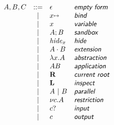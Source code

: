 \documentclass[12pt]{amsart}
\begin{document}
\thispagestyle{empty}
\pagestyle{empty}


\newcommand{\ef}{\ensuremath{\epsilon}}
\renewcommand{\root}[0]{\mbox{\textbf{R}}}
\newcommand{\bind}[0]{{{\raisebox{.2ex}{\scriptsize$\mapsto$}}}}
\newcommand{\hide}[1]{\mathit{hide}_{#1}}
\newcommand{\inspect}[0]{\mbox{\textbf{L}}}
\newcommand{\prl}[0]{~|~}
\newcommand{\rulename}[1]{\textsf{\textit{#1}}}

\[
\begin{array}{rcll}
A,B,C
&::=& \ef       & \rulename{empty form}\\
&|& x\bind      & \rulename{bind}\\
&|& x           & \rulename{variable}\\ 
&|& A; B        & \rulename{sandbox}\\
&|& \hide x     & \rulename{hide}\\
&|& A \cdot B   & \rulename{extension}\\
&|& \lambda x.A & \rulename{abstraction}\\
&|& AB          & \rulename{application}\\
&|& \root       & \rulename{current root}\\
&|& \inspect    & \rulename{inspect}\\
&|& A\prl B     & \rulename{parallel}\\
&|& \nu c.A     & \rulename{restriction}\\
&|& c?          & \rulename{input}\\
&|& c           & \rulename{output}\\
\end{array}
\]
\newpage
\end{document}
